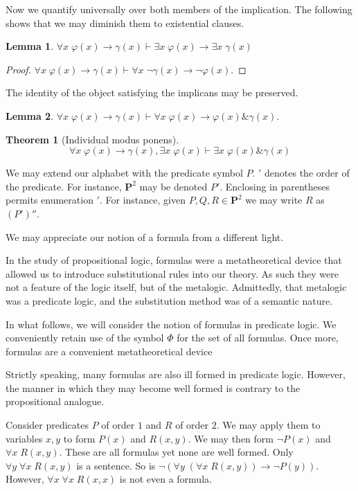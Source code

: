 \documentclass{amsbook}
\newcommand{\infers}{\mathrel\vdash}
\newcommand{\univ}[1]{\mathord\forall#1\;}
\newcommand{\exis}[1]{\mathord\exists#1\;}
\newcommand{\then}{\mathrel\rightarrow}
\newcommand{\conj}{\mathrel\&}
\theoremstyle{definition}
\newtheorem{thm}{Theorem}[section]
\newtheorem{lmm}{Lemma}[section]
\begin{document}
Now we quantify universally over both members of the implication. The following shows that we may diminish them to existential clauses.

\begin{lmm}
    $\univ x \varphi(x) \then \gamma(x) \infers \exis x \varphi(x) \then \exis x \gamma(x)$
    \begin{proof}
        $\univ x \varphi(x) \then \gamma(x) \infers \univ x \neg\gamma(x) \then \neg\varphi(x)$.
    \end{proof}
\end{lmm}

The identity of the object satisfying the implicans may be preserved.

\begin{lmm}
    $\univ x \varphi(x) \then \gamma(x) \infers \univ x \varphi(x) \then \varphi(x) \conj \gamma(x)$.
\end{lmm}

\begin{thm}[Individual modus ponens]
    $$\univ x \varphi(x) \then \gamma(x), \exis x \varphi(x) \infers \exis x \varphi(x) \conj \gamma(x)$$
\end{thm}




\newpage


We may extend our alphabet with the predicate symbol $P$. $'$ denotes the order of the predicate. For instance, $\mathbf P^2$ may be denoted $P'$. Enclosing in parentheses permits enumeration $'$. For instance, given $P, Q, R \in \mathbf P^2$ we may write $R$ as $(P')''$.


We may appreciate our notion of a formula from a different light.

In the study of propositional logic, formulas were a metatheoretical device that allowed us to introduce substitutional rules into our theory. As such they were not a feature of the logic itself, but of the metalogic. Admittedly, that metalogic was a predicate logic, and the substitution method was of a semantic nature.

In what follows, we will consider the notion of formulas in predicate logic. We conveniently retain use of the symbol $\Phi$ for the set of all formulas. Once more, formulas are a convenient metatheoretical device

Strictly speaking, many formulas are also ill formed in predicate logic. However, the manner in which they may become well formed is contrary to the propositional analogue.

Consider predicates $P$ of order $1$ and $R$ of order $2$. We may apply them to variables $x, y$ to form $P(x)$ and $R(x,y)$. We may then form $\neg P(x)$ and $\univ x R(x, y)$. These are all formulas yet none are well formed. Only $\univ y \univ x R(x,y)$ is a sentence. So is $\neg(\univ y (\univ x R(x,y)) \then \neg P(y))$. However, $\univ x \univ x R(x, x)$ is not even a formula.
\end{document}
